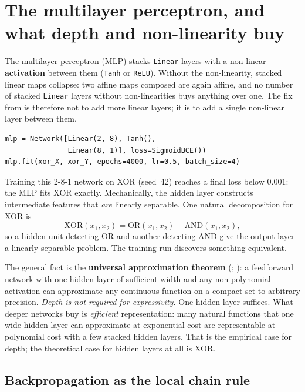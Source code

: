
\section[The multilayer perceptron]{The multilayer perceptron, and what depth and non-linearity buy}%
\label{sec:mlp-backprop}

The multilayer perceptron (MLP) stacks \texttt{Linear} layers with a
non-linear \textbf{activation} between them (\texttt{Tanh} or
\texttt{ReLU}). Without the non-linearity, stacked linear maps collapse:
two affine maps composed are again affine, and no number of stacked
\texttt{Linear} layers without non-linearities buys anything over one.
The fix from  is therefore not to add more
linear layers; it is to add a single non-linear layer between them.

\begin{lstlisting}
mlp = Network([Linear(2, 8), Tanh(),
               Linear(8, 1)], loss=SigmoidBCE())
mlp.fit(xor_X, xor_Y, epochs=4000, lr=0.5, batch_size=4)
\end{lstlisting}

Training this 2-8-1 network on XOR (seed~42) reaches a final loss below
$0.001$: the MLP fits XOR exactly. Mechanically, the hidden layer
constructs intermediate features that \emph{are} linearly separable. One
natural decomposition for XOR is
\[
  \mathrm{XOR}(x_1, x_2) = \mathrm{OR}(x_1, x_2) - \mathrm{AND}(x_1, x_2),
\]
so a hidden unit detecting OR and another detecting AND give the output
layer a linearly separable problem. The training run discovers something
equivalent.

The general fact is the \textbf{universal approximation theorem}
(\cite{cybenko1989}; \cite{hornik1989}): a feedforward network with one
hidden layer of sufficient width and any non-polynomial activation can
approximate any continuous function on a compact set to arbitrary
precision. \emph{Depth is not required for expressivity.} One hidden
layer suffices. What deeper networks buy is \emph{efficient}
representation: many natural functions that one wide hidden layer can
approximate at exponential cost are representable at polynomial cost
with a few stacked hidden layers. That is the empirical case for depth;
the theoretical case for hidden layers at all is XOR.

\subsection*{Backpropagation as the local chain rule}

